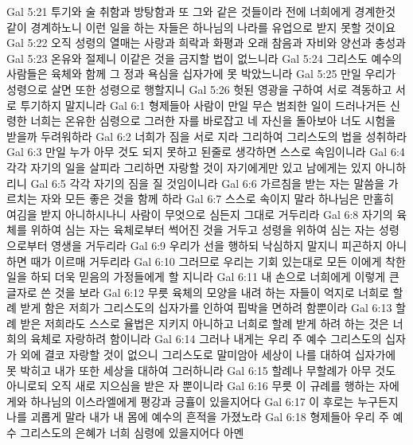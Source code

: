 Gal 5:21  투기와 술 취함과 방탕함과 또 그와 같은 것들이라 전에 너희에게 경계한것 같이 경계하노니 이런 일을 하는 자들은 하나님의 나라를 유업으로 받지 못할 것이요
Gal 5:22  오직 성령의 열매는 사랑과 희락과 화평과 오래 참음과 자비와 양선과 충성과
Gal 5:23  온유와 절제니 이같은 것을 금지할 법이 없느니라
Gal 5:24  그리스도 예수의 사람들은 육체와 함께 그 정과 욕심을 십자가에 못 박았느니라
Gal 5:25  만일 우리가 성령으로 살면 또한 성령으로 행할지니
Gal 5:26  헛된 영광을 구하여 서로 격동하고 서로 투기하지 말지니라
Gal 6:1  형제들아 사람이 만일 무슨 범죄한 일이 드러나거든 신령한 너희는 온유한 심령으로 그러한 자를 바로잡고 네 자신을 돌아보아 너도 시험을 받을까 두려워하라
Gal 6:2  너희가 짐을 서로 지라 그리하여 그리스도의 법을 성취하라
Gal 6:3  만일 누가 아무 것도 되지 못하고 된줄로 생각하면 스스로 속임이니라
Gal 6:4  각각 자기의 일을 살피라 그리하면 자랑할 것이 자기에게만 있고 남에게는 있지 아니하리니
Gal 6:5  각각 자기의 짐을 질 것임이니라
Gal 6:6  가르침을 받는 자는 말씀을 가르치는 자와 모든 좋은 것을 함께 하라
Gal 6:7  스스로 속이지 말라 하나님은 만홀히 여김을 받지 아니하시나니 사람이 무엇으로 심든지 그대로 거두리라
Gal 6:8  자기의 육체를 위하여 심는 자는 육체로부터 썩어진 것을 거두고 성령을 위하여 심는 자는 성령으로부터 영생을 거두리라
Gal 6:9  우리가 선을 행하되 낙심하지 말지니 피곤하지 아니하면 때가 이르매 거두리라
Gal 6:10  그러므로 우리는 기회 있는대로 모든 이에게 착한 일을 하되 더욱 믿음의 가정들에게 할 지니라
Gal 6:11  내 손으로 너희에게 이렇게 큰 글자로 쓴 것을 보라
Gal 6:12  무릇 육체의 모양을 내려 하는 자들이 억지로 너희로 할례 받게 함은 저희가 그리스도의 십자가를 인하여 핍박을 면하려 함뿐이라
Gal 6:13  할례 받은 저희라도 스스로 율법은 지키지 아니하고 너희로 할례 받게 하려 하는 것은 너희의 육체로 자랑하려 함이니라
Gal 6:14  그러나 내게는 우리 주 예수 그리스도의 십자가 외에 결코 자랑할 것이 없으니 그리스도로 말미암아 세상이 나를 대하여 십자가에 못 박히고 내가 또한 세상을 대하여 그러하니라
Gal 6:15  할례나 무할례가 아무 것도 아니로되 오직 새로 지으심을 받은 자 뿐이니라
Gal 6:16  무릇 이 규례를 행하는 자에게와 하나님의 이스라엘에게 평강과 긍휼이 있을지어다
Gal 6:17  이 후로는 누구든지 나를 괴롭게 말라 내가 내 몸에 예수의 흔적을 가졌노라
Gal 6:18  형제들아 우리 주 예수 그리스도의 은혜가 너희 심령에 있을지어다 아멘


